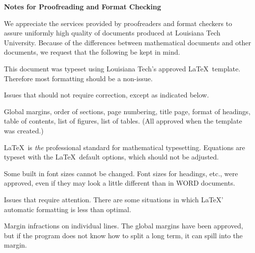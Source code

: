 \documentclass[12pt]{report}
\renewenvironment{itemize}{%
\vspace{-.15in} %
    \begin{olditemize}%
\setlength{\parsep}{0ex}
\setlength{\topsep}{0ex}
\setlength{\partopsep}{0ex}
      \setlength{\parskip}{0pt}%
      \setlength{\itemsep}{0pt}%
  }%
  {%
    \end{olditemize}%
  }
\numberwithin{equation}{chapter}
\begin{document}
\begin{singlespace}

\centerline{\bf Notes for Proofreading and Format Checking}

\vspace{.1in}


We appreciate the services provided by proofreaders and
format checkers to assure uniformly high quality of documents
produced at Louisiana Tech University.
Because of the differences between mathematical
documents and other documents, we request that the following
be kept in mind.

\begin{itemize}
\item
This document was typeset using Louisiana Tech's approved
\LaTeX \ template. Therefore most formatting
should be a non-issue.

\item
Issues that should not require correction, except
as indicated below.

\vspace{.1in} %

\begin{itemize}
\item
Global margins, order of sections, page numbering,
title page, format of
headings, table of contents, list of figures, list of tables.
(All approved when the template was created.)

\item
\LaTeX \ is {\em the} professional standard for mathematical typesetting.
Equations are typeset with
the \LaTeX \ default options, which should not be adjusted.

\item
Some built in font sizes cannot be changed.
Font sizes for headings, etc.,
were approved, even if they may look a little different
than in WORD documents.

\end{itemize}

\item
Issues that require attention.
There are some situations in which
\LaTeX' automatic formatting is less than optimal.

\vspace{.1in} %

\begin{itemize}
\item
Margin infractions on individual lines.
The global margins have been approved, but if the program
does not know how to split a long term, it can spill into the margin.


\end{itemize}
\end{itemize}
\end{singlespace}
\end{document}
